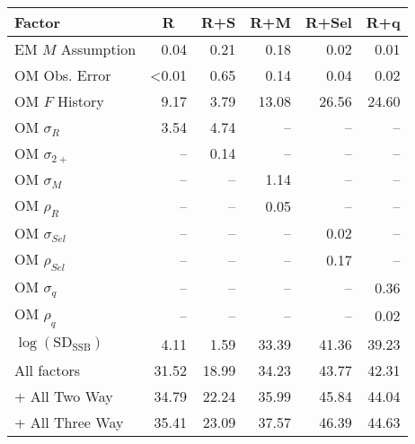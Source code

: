 \begin{center}
\begin{tabular}{lrrrrr}
\hline\hline
\multicolumn{1}{l}{Factor}&\multicolumn{1}{c}{R}&\multicolumn{1}{c}{R+S}&\multicolumn{1}{c}{R+M}&\multicolumn{1}{c}{R+Sel}&\multicolumn{1}{c}{R+q}\tabularnewline
\hline
EM $M$ Assumption& 0.04& 0.21& 0.18& 0.02& 0.01\tabularnewline
OM Obs. Error&\textless  0.01& 0.65& 0.14& 0.04& 0.02\tabularnewline
OM $F$ History& 9.17& 3.79&13.08&26.56&24.60\tabularnewline
OM $\sigma_R$& 3.54& 4.74&--&--&--\tabularnewline
OM $\sigma_{2+}$ &--& 0.14&--&--&--\tabularnewline
OM $\sigma_M$&--&--& 1.14&--&--\tabularnewline
OM $\rho_R$&--&--& 0.05&--&--\tabularnewline
OM $\sigma_{Sel}$&--&--&--& 0.02&--\tabularnewline
OM $\rho_{Sel}$&--&--&--& 0.17&--\tabularnewline
OM $\sigma_q$&--&--&--&--& 0.36\tabularnewline
OM $\rho_q$&--&--&--&--& 0.02\tabularnewline
$\log\left(\text{SD}_\text{SSB}\right)$& 4.11& 1.59&33.39&41.36&39.23\tabularnewline
All factors&31.52&18.99&34.23&43.77&42.31\tabularnewline
+ All Two Way&34.79&22.24&35.99&45.84&44.04\tabularnewline
+ All Three Way&35.41&23.09&37.57&46.39&44.63\tabularnewline
\hline
\end{tabular}\end{center}
